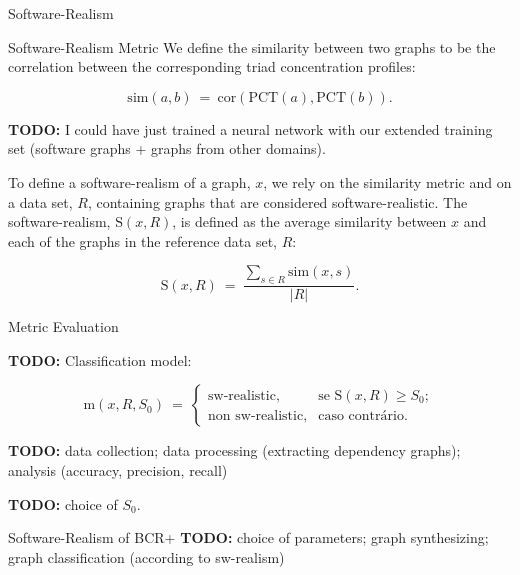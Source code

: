 \documentclass[11pt,twocolumn,a4paper,english]{article}
\newcommand{\TODO}{\textbf{TODO:} }
\begin{document}
\begin{section}{Software-Realism}
\begin{subsection}{Software-Realism Metric}
	We define the similarity between two graphs to be the correlation between the corresponding triad concentration profiles:
	
	$$
  \mathrm{sim}(a, b) ~=~ 
    \mathrm{cor}(\mathrm{PCT}(a), \mathrm{PCT}(b))\mathrm{.}
  $$
	
	\TODO I could have just trained a neural network with our extended training set (software graphs + graphs from other domains).
	
	To define a software-realism of a graph, $x$, we rely on the similarity metric and on a data set, $R$, containing graphs that are considered software-realistic. The software-realism, $\mathrm{S}(x, R)$, is defined as the average similarity between $x$ and each of the graphs in the reference data set, $R$:
		
	$$
  \mathrm{S}(x, R) ~=~ \frac{
  \displaystyle\sum_{s \in R} \mathrm{sim}(x, s)
  }{|R|} \mbox{.}
  $$

\end{subsection}
	
\begin{subsection}{Metric Evaluation}
	
	\TODO Classification model:
	
	$$
	  \mathrm{m}(x, R, S_0) ~=~
	  \left\{
	  \begin{array}{cl}
	  \mbox{sw-realistic,} & \mbox{se } \mathrm{S}(x, R) \ge S_0; \\
	  \mbox{non sw-realistic,} & \mbox{caso contrário.}
	  \end{array}
	  \right.
	$$	
	
	\TODO data collection; data processing (extracting dependency graphs); analysis (accuracy, precision, recall)
	
	\TODO choice of $S_0$.
	
\end{subsection}
	
\begin{subsection}{Software-Realism of BCR+}
	\TODO choice of parameters; graph synthesizing; graph classification (according to sw-realism)
\end{subsection}
	
\end{section}

\end{document}
